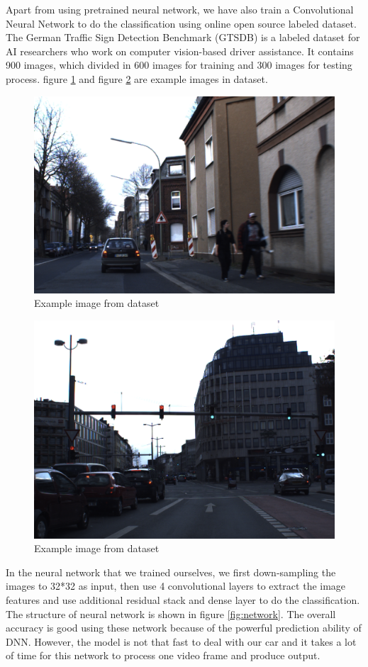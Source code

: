\documentclass[11pt, titlepage]{article} %
\begin{document}
Apart from using pretrained neural network, we have also train a Convolutional Neural Network to do the classification using online open source labeled dataset. The German Traffic Sign Detection Benchmark (GTSDB) is a labeled dataset for AI researchers who work on computer vision-based driver assistance. It contains 900 images, which divided in 600 images for training and 300 images for testing process. figure \ref{fig:GTSDB1} and figure \ref{fig:GTSDB2} are example images in dataset.
\begin{figure}[]
	\centering
   	\includegraphics[scale=0.3]{GTSDB1.jpg}
   	\caption{Example image from dataset}
   	\label{fig:GTSDB1}
\end{figure}

\begin{figure}[]
	\centering
   	\includegraphics[scale=0.3]{GTSDB2.png}
   	\caption{Example image from dataset}
   	\label{fig:GTSDB2}
\end{figure}
In the neural network that we trained ourselves, we first down-sampling the images to 32*32 as input, then use 4 convolutional layers to extract the image features and use additional residual stack and dense layer to do the classification. The structure of neural network is shown in figure \ref{fig:network}. The overall accuracy is good using these network because of the powerful prediction ability of DNN. However, the model is not that fast to deal with our car and it takes a lot of time for this network to process one video frame and produce output. 
\end{document}
